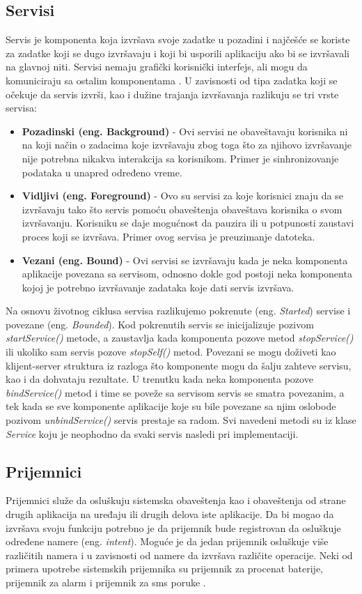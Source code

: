 \documentclass[android.tex]{subfiles}
\begin{document}
\subsection{Servisi}
Servis je komponenta koja izvršava svoje zadatke u pozadini i najčešće se koriste za zadatke koji se dugo izvršavaju i koji bi usporili aplikaciju ako bi se izvršavali na glavnoj niti. Servisi nemaju grafički korisnički interfejs, ali mogu da komuniciraju sa ostalim komponentama \cite{book:hellman}. U zavisnosti od tipa zadatka koji se očekuje da servis izvrši, kao i dužine trajanja izvršavanja razlikuju se tri vrste servisa:
\begin{itemize}
    \item \textbf{Pozadinski (eng. Background)} - Ovi servisi ne obaveštavaju korisnika ni na koji način o zadacima koje izvršavaju zbog toga što za njihovo izvršavanje nije potrebna nikakva interakcija sa korisnikom. Primer je sinhronizovanje podataka u unapred određeno vreme.  
    \item \textbf{Vidljivi (eng. Foreground)} - Ovo su servisi za koje korisnici znaju da se izvršavaju tako što servis pomoću obaveštenja obaveštava korisnika o svom izvršavanju. Korisniku se daje mogućnost da pauzira ili u potpunosti zaustavi proces koji se izvršava. Primer ovog servisa je preuzimanje datoteka.
    \item \textbf{Vezani (eng. Bound)} - Ovi servisi se izvršavaju kada je neka komponenta aplikacije povezana sa servisom, odnosno dokle god postoji neka komponenta kojoj je potrebno izvršavanje zadataka koje dati servis izvršava.
\end{itemize}

Na osnovu životnog ciklusa servisa razlikujemo pokrenute (eng. \textit{Started}) servise i povezane (eng. \textit{Bounded}). Kod pokrenutih servis se inicijalizuje pozivom \textit{startService() }metode, a zaustavlja kada komponenta pozove metod \textit{stopService() }ili ukoliko sam servis pozove\textit{ stopSelf() }metod. Povezani se mogu doživeti kao klijent-server struktura iz razloga što komponente mogu da šalju zahteve servisu, kao i da dohvataju rezultate. U trenutku kada neka komponenta pozove \textit{bindService()} metod i time se poveže sa servisom servis se smatra povezanim, a tek kada se sve komponente aplikacije koje su bile povezane sa njim oslobode pozivom \textit{unbindService() }servis prestaje sa radom. Svi navedeni metodi su iz klase \textit{Service} koju je neophodno da svaki servis nasledi pri implementaciji.


\subsection{Prijemnici}
Prijemnici služe da osluškuju sistemska obaveštenja kao i obaveštenja od strane drugih aplikacija na uređaju ili drugih delova iste aplikacije. Da bi mogao da izvršava svoju funkciju potrebno je da prijemnik bude registrovan da osluškuje određene namere (eng.\textit{ intent}). Moguće je da jedan prijemnik osluškuje više različitih namera i u zavisnosti od namere da izvršava različite operacije. Neki od primera upotrebe sistemskih prijemnika su prijemnik za procenat baterije, prijemnik za alarm i prijemnik za sms poruke \cite{book:mzivkovic}. 
\end{document}
